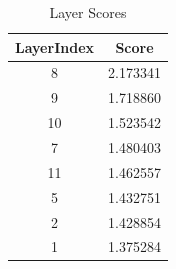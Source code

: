 
\begin{table}[h]
\centering
\begin{tabular}{|c|c|}
\hline
LayerIndex & Score \\
\hline
8 & 2.173341 \\
\hline
9 & 1.718860 \\
\hline
10 & 1.523542 \\
\hline
7 & 1.480403 \\
\hline
11 & 1.462557 \\
\hline
5 & 1.432751 \\
\hline
2 & 1.428854 \\
\hline
1 & 1.375284 \\
\hline
\end{tabular}
\caption{Layer Scores}
\end{table}
